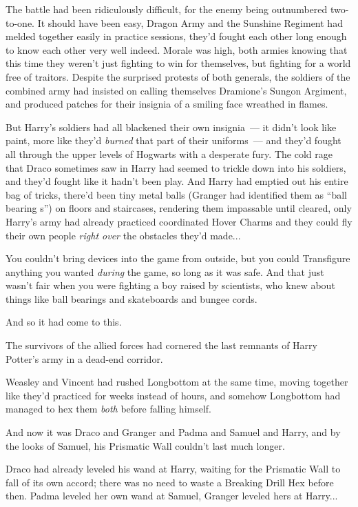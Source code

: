The battle had been ridiculously difficult, for the enemy being outnumbered two-to-one. It should have been easy, Dragon Army and the Sunshine Regiment had melded together easily in practice sessions, they'd fought each other long enough to know each other very well indeed. Morale was high, both armies knowing that this time they weren't just fighting to win for themselves, but fighting for a world free of traitors. Despite the surprised protests of both generals, the soldiers of the combined army had insisted on calling themselves Dramione's Sungon Argiment, and produced patches for their insignia of a smiling face wreathed in flames.

But Harry's soldiers had all blackened their own insignia~--- it didn't look like paint, more like they'd \emph{burned} that part of their uniforms~--- and they'd fought all through the upper levels of Hogwarts with a desperate fury. The cold rage that Draco sometimes saw in Harry had seemed to trickle down into his soldiers, and they'd fought like it hadn't been play. And Harry had emptied out his entire bag of tricks, there'd been tiny metal balls (Granger had identified them as ``ball bearing s'') on floors and staircases, rendering them impassable until cleared, only Harry's army had already practiced coordinated Hover Charms and they could fly their own people \emph{right over} the obstacles they'd made...

You couldn't bring devices into the game from outside, but you could Transfigure anything you wanted \emph{during} the game, so long as it was safe. And that just wasn't fair when you were fighting a boy raised by scientists, who knew about things like ball bearings and skateboards and bungee cords.

And so it had come to this.

The survivors of the allied forces had cornered the last remnants of Harry Potter's army in a dead-end corridor.

Weasley and Vincent had rushed Longbottom at the same time, moving together like they'd practiced for weeks instead of hours, and somehow Longbottom had managed to hex them \emph{both} before falling himself.

And now it was Draco and Granger and Padma and Samuel and Harry, and by the looks of Samuel, his Prismatic Wall couldn't last much longer.

Draco had already leveled his wand at Harry, waiting for the Prismatic Wall to fall of its own accord; there was no need to waste a Breaking Drill Hex before then. Padma leveled her own wand at Samuel, Granger leveled hers at Harry...

